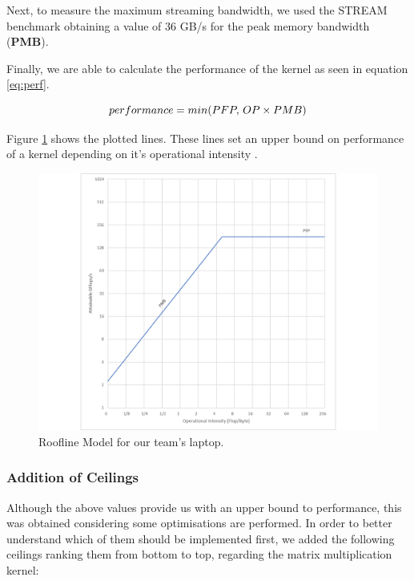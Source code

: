 \documentclass[twoside,twocolumn]{article}
\begin{document}
Next, to measure the maximum streaming bandwidth, we used the STREAM benchmark obtaining a value of 36 GB/s for the peak memory bandwidth (\textbf{PMB}).

Finally, we are able to calculate the performance of the kernel as seen in equation \ref{eq:perf}. 

\begin{equation}
\label{eq:perf}
performance = min(PFP, \thinspace OP \times PMB)
\end{equation}

Figure \ref{fig:roofline} shows the plotted lines. These lines set an upper bound on performance of a kernel depending on it's operational intensity \cite{roofline}.

\begin{figure}[H]
    \includegraphics[width=\columnwidth]{laptop_roofline.png}
    \centering
    \caption{Roofline Model for our team's laptop.}
    \label{fig:roofline}
\end{figure}

\subsubsection{Addition of Ceilings}

Although the above values provide us with an upper bound to performance, this was obtained considering some optimisations are performed. In order to better understand which of them should be implemented first, we added the following ceilings ranking them from bottom to top, regarding the matrix multiplication kernel:
\end{document}
